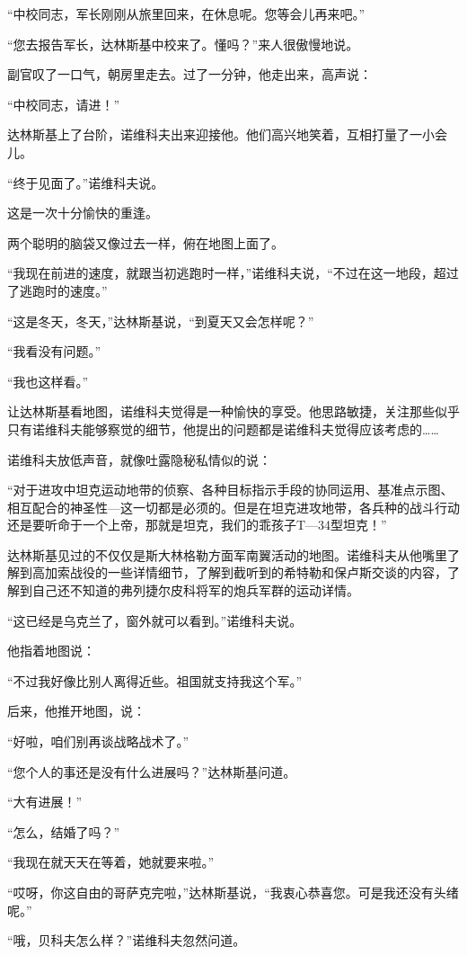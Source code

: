 “中校同志，军长刚刚从旅里回来，在休息呢。您等会儿再来吧。”

“您去报告军长，达林斯基中校来了。懂吗？”来人很傲慢地说。

副官叹了一口气，朝房里走去。过了一分钟，他走出来，高声说：

“中校同志，请进！”

达林斯基上了台阶，诺维科夫出来迎接他。他们高兴地笑着，互相打量了一小会儿。

“终于见面了。”诺维科夫说。

这是一次十分愉快的重逢。

两个聪明的脑袋又像过去一样，俯在地图上面了。

“我现在前进的速度，就跟当初逃跑时一样，”诺维科夫说，“不过在这一地段，超过了逃跑时的速度。”

“这是冬天，冬天，”达林斯基说，“到夏天又会怎样呢？”

“我看没有问题。”

“我也这样看。”

让达林斯基看地图，诺维科夫觉得是一种愉快的享受。他思路敏捷，关注那些似乎只有诺维科夫能够察觉的细节，他提出的问题都是诺维科夫觉得应该考虑的……

诺维科夫放低声音，就像吐露隐秘私情似的说：

“对于进攻中坦克运动地带的侦察、各种目标指示手段的协同运用、基准点示图、相互配合的神圣性—这一切都是必须的。但是在坦克进攻地带，各兵种的战斗行动还是要听命于一个上帝，那就是坦克，我们的乖孩子T—34型坦克！”

达林斯基见过的不仅仅是斯大林格勒方面军南翼活动的地图。诺维科夫从他嘴里了解到高加索战役的一些详情细节，了解到截听到的希特勒和保卢斯交谈的内容，了解到自己还不知道的弗列捷尔皮科将军的炮兵军群的运动详情。

“这已经是乌克兰了，窗外就可以看到。”诺维科夫说。

他指着地图说：

“不过我好像比别人离得近些。祖国就支持我这个军。”

后来，他推开地图，说：

“好啦，咱们别再谈战略战术了。”

“您个人的事还是没有什么进展吗？”达林斯基问道。

“大有进展！”

“怎么，结婚了吗？”

“我现在就天天在等着，她就要来啦。”

“哎呀，你这自由的哥萨克完啦，”达林斯基说，“我衷心恭喜您。可是我还没有头绪呢。”

“哦，贝科夫怎么样？”诺维科夫忽然问道。

